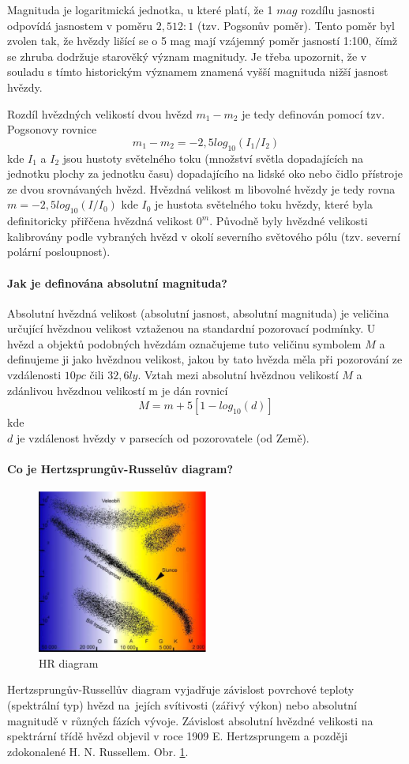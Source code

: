 \documentclass[11pt,a4paper,notitlepage,twocolumn]{article}
\begin{document}
Magnituda je logaritmická jednotka, u které platí, že 1 $ mag $ rozdílu jasnosti odpovídá
jasnostem v poměru $ 2,512:1 $ (tzv. Pogsonův poměr). Tento poměr byl zvolen tak, že hvězdy
lišící se o 5 mag mají vzájemný poměr jasností 1:100, čímž se zhruba dodržuje starověký 
význam magnitudy. Je třeba upozornit, že v souladu s tímto historickým významem znamená 
vyšší magnituda nižší jasnost hvězdy.

Rozdíl hvězdných velikostí dvou hvězd $ m_1 − m_2 $ je tedy definován pomocí tzv.
Pogsonovy rovnice
\[ m_1 − m_2 = −2,5 log_{10}(I_1/I_2) \]
kde $ I_1 $ a $ I_2 $ jsou hustoty světelného toku (množství světla dopadajících na jednotku
plochy za jednotku času) dopadajícího na lidské oko nebo čidlo přístroje ze dvou srovnávaných
hvězd. Hvězdná velikost m libovolné hvězdy je tedy rovna
$ m = −2,5 log_{10}(I/I_0) $
kde $ I_0 $ je hustota světelného toku hvězdy, které byla definitoricky přiřčena hvězdná
velikost $ 0^m $. Původně byly hvězdné velikosti kalibrovány podle vybraných hvězd v okolí
severního světového pólu (tzv. severní polární posloupnost).
\paragraph{Jak je definována absolutní magnituda?}
Absolutní hvězdná velikost (absolutní jasnost, absolutní magnituda) je veličina určující
hvězdnou velikost vztaženou na standardní pozorovací podmínky.
U hvězd a objektů podobných hvězdám označujeme tuto veličinu symbolem $ M $ a definujeme
ji jako hvězdnou velikost, jakou by tato hvězda měla při pozorování ze vzdálenosti 
$ 10pc $ čili $ 32,6ly $. Vztah mezi absolutní hvězdnou velikostí $ M $ a zdánlivou 
hvězdnou velikostí m je dán rovnicí
\[ M = m + 5 [1 − log_{10}(d)] \]
kde\\
$ d $ je vzdálenost hvězdy v parsecích od pozorovatele (od Země).

\paragraph{Co je Hertzsprungův-Russelův diagram?}
\begin{figure}[H]
\includegraphics[width=0.5\textwidth]{HR_diagram}
\caption{HR diagram}
\label{fig:HR_diagram}
\end{figure}
Hertzsprungův-Russellův diagram vyjadřuje závislost povrchové teploty (spektrální typ)
hvězd 
na~jejích svítivosti (zářivý výkon) nebo absolutní magnitudě v různých fázích vývoje. 
Závislost absolutní hvězdné velikosti na spektrární třídě hvězd objevil v roce 1909 E.
Hertzsprungem a později zdokonalené H. N. Russellem. Obr. \ref{fig:HR_diagram}.
\end{document}
